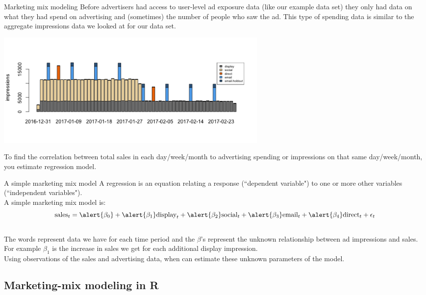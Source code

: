 \documentclass[10pt, aspectratio=169]{beamer}
\begin{document}
\begin{frame}{Marketing mix modeling}
Before advertisers had access to user-level ad exposure data (like our example data set) they only had data on what they had spend on advertising and (sometimes) the number of people who saw the ad. This type of spending data is similar to the aggregate impressions data we looked at for our data set. 
\begin{center}
\includegraphics[width=0.6\textwidth]{images/cadence.png}
\end{center}
To find the correlation between \alert{total sales} in each day/week/month to \alert{advertising spending or impressions} on that same day/week/month, you estimate \alert{regression} model. 
\end{frame}

\begin{frame}{A simple marketing mix model}
A regression is an equation relating a response (``dependent variable") to one or more other variables (``independent variables"). \\
\bigskip \pause
A simple marketing mix model is: \\
\begin{equation*}
\textnormal{sales}_t = \alert{\beta_0} + \alert{\beta_1} \textnormal{display}_t + \alert{\beta_2}\textnormal{social}_t + \alert{\beta_3} \textnormal{email}_t + \alert{\beta_4} \textnormal{direct}_t + \epsilon_t
\end{equation*}\\
\bigskip \pause
The words represent data we have for each time period and the \alert{$\beta$}'s represent the unknown relationship between ad impressions and sales. For example \alert{$\beta_1$} is the increase in sales we get for each additional display impression. \\
\bigskip \pause 
Using observations of the sales and advertising data, when can estimate these unknown parameters of the model.  
\end{frame}

\subsection{Marketing-mix modeling in R}
\end{document}
